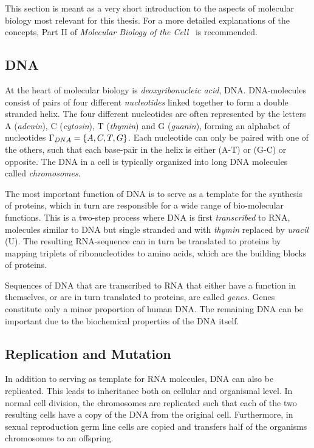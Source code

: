 This section is meant as a very short introduction to the aspects of molecular biology most relevant for this thesis.
For a more detailed explanations of the concepts, Part II of \emph{Molecular Biology of the Cell}~\cite{molbio} is recommended.

\subsection{DNA}
At the heart of molecular biology is \emph{deoxyribonucleic acid}, DNA.
DNA-molecules consist of pairs of four different \emph{nucleotides} linked together to form a double stranded helix.
The four different nucleotides are often represented by the letters A (\emph{adenin}), C (\emph{cytosin}), T (\emph{thymin}) and G (\emph{guanin}), forming an alphabet of nucleotides $\Gamma_{DNA} = \left\{A, C, T, G\right\}$.
Each nucleotide can only be paired with one of the others, such that each base-pair in the helix is either (A-T) or (G-C) or opposite. The DNA in a cell is typically organized into long DNA molecules called \emph{chromosomes}. 

The most important function of DNA is to serve as a template for the synthesis of proteins, which in turn are responsible for a wide range of bio-molecular functions.
This is a two-step process where DNA is first \emph{transcribed} to RNA, molecules similar to DNA but single stranded and with \emph{thymin} replaced by \emph{uracil} (U).
The resulting RNA-sequence can in turn be translated to proteins by mapping triplets of ribonucleotides to amino acids, which are the building blocks of proteins.

Sequences of DNA that are transcribed to RNA that either have a function in themselves, or are in turn translated to proteins, are called \emph{genes}.
Genes constitute only a minor proportion of human DNA.
The remaining DNA can be important due to the biochemical properties of the DNA itself. 


\subsection{Replication and Mutation}
In addition to serving as template for RNA molecules, DNA can also be replicated.
This leads to inheritance both on cellular and organismal level.
In normal cell division, the chromosomes are replicated such that each of the two resulting cells have a copy of the DNA from the original cell.
Furthermore, in sexual reproduction germ line cells are copied and transfers half of the organisms chromosomes to an offspring.

